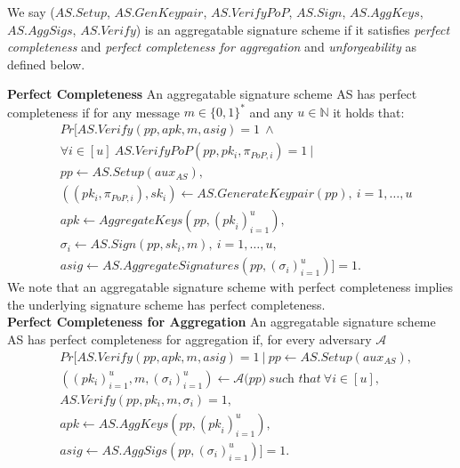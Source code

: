 \begin{definition}
\noindent We say ($\mathit{AS.Setup}$, $\mathit{AS.GenKeypair}$, $\mathit{AS.VerifyPoP}$, 
$\mathit{AS.Sign}$, $\mathit{AS.AggKeys}$,  $\mathit{AS.AggSigs}$, 
$\mathit{AS.Verify}$) is an aggregatable signature scheme if it satisfies \emph{perfect completeness}  and 
\emph{perfect completeness for aggregation}  and \emph{unforgeability} as defined below. 

\noindent \textbf{Perfect Completeness} An aggregatable signature scheme
AS has perfect completeness if for any message $m \in \{0,1\}^*$ and any 
$u\in\mathbb{N}$ it holds that:
\begin{align*}
&\mathit{Pr} [\mathit{AS.Verify}(\mathit{pp}, \mathit{apk}, m, \mathit{asig})=1 \  \wedge \ \\
& \forall  i \in [u]\ \mathit{AS.VerifyPoP}(\mathit{pp}, \mathit{pk_i},\mathit{\pi_{\mathit{PoP},i}})=1\ |\\
& \mathit{pp} \leftarrow \mathit{AS.Setup}(\mathit{aux_{\mathit{AS}}}), \\
& ((pk_{i},\pi_{\mathit{PoP}, i}), sk_{i} ) \leftarrow \mathit{AS.GenerateKeypair}(\mathit{pp}),\ i=1,\ldots, u\\
&\mathit{apk} \leftarrow \mathit{AggregateKeys}(\mathit{pp}, (\mathit{pk}_{i})_{i=1}^{u}), \\
& \sigma_i \leftarrow \mathit{AS.Sign}(\mathit{pp}, \mathit{sk_i}, m),\ i=1,\ldots, u, \\
& \mathit{asig} \leftarrow \mathit{AS.AggregateSignatures(\mathit{pp}, (\sigma_{i})_{i=1}^{u})}] = 1.
\end{align*}
\noindent We note that an aggregatable signature scheme with perfect completeness implies the underlying signature scheme
has perfect completeness. \\

\noindent \textbf{Perfect Completeness for Aggregation} An aggregatable signature scheme AS
has perfect completeness for aggregation if, for every adversary $\mathcal{A}$
\begin{align*}
& \mathit{Pr}[\mathit{AS.Verify}(\mathit{pp}, \mathit{apk}, m, \mathit{asig}) = 1 \ | \ \mathit{pp} \leftarrow \mathit{AS.Setup}(\mathit{aux_{\mathit{AS}}}), \\
& ((\mathit{pk_i})_{i=1}^u, m, (\sigma_i)_{i=1}^{u}) \leftarrow \mathcal{A}(\mathit{\mathit{pp})} \ 
\textit{such that} \ \forall i \in [u], \\
&\mathit{AS.Verify}(\mathit{pp}, \mathit{pk_i}, m, \sigma_i) = 1, \\
& \mathit{apk} \leftarrow \mathit{AS.AggKeys}(\mathit{pp},  (\mathit{pk}_{i})_{i=1}^{u}), \\
&  \mathit{asig} \leftarrow \mathit{AS.AggSigs}(\mathit{pp}, (\sigma_i)_{i=1}^u)] = 1.
\end{align*}


\end{definition}
